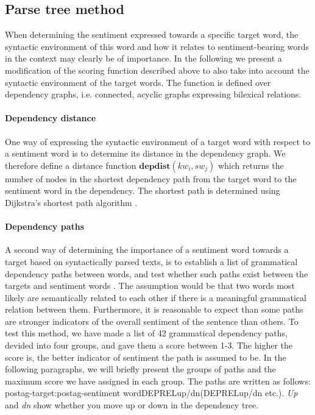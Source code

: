 \documentclass[11pt]{article}
\begin{document}
\subsection{Parse tree method}
\label{sec:dp}
When determining the sentiment expressed towards a specific target
word, the syntactic environment of this word and how it relates to
sentiment-bearing words in the context may clearly be of importance.
In the following we present a modification of the scoring function described above to also take into account the syntactic environment of the target words. The function is defined over dependency graphs, i.e. connected, acyclic graphs expressing bilexical relations.

\paragraph{Dependency distance} One way of expressing the syntactic environment of a target word with respect to a sentiment word is to determine its distance in the dependency graph. We therefore define a distance function $\mathbf{depdist}(kw_i, sw_{j})$ which returns the number of nodes in the shortest dependency path from the target word to the sentiment word in the dependency. The shortest path is determined using Dijkstra's shortest path algorithm \cite{Dij:59}.

\paragraph{Dependency paths}
A second way of determining the importance of a sentiment word towards a target based on syntactically parsed texts, is to establish a list of grammatical dependency paths between words, and test whether such paths exist between the targets and sentiment words \cite{Jiang11}. The assumption would be that two words most likely are semantically related to each other if there is a meaningful grammatical relation between them. Furthermore, it is reasonable to expect than some paths are stronger indicators of the overall sentiment of the sentence than others. To test this method, we have made a list of 42 grammatical dependency paths, devided into four groups, and gave them a score between 1-3. The higher the score is, the better indicator of sentiment the path is assumed to be. In the following paragraphs, we will briefly present the groups of paths and the maximum score we have assigned in each group. The paths are written as follows: postag-target:postag-sentiment word{\textunderscore}{\textunderscore}DEPREL{\textunderscore}up/dn({\textunderscore}{\textunderscore}DEPREL{\textunderscore}up/dn etc.). \emph{Up} and \emph{dn} show whether you move up or down in the dependency tree.
\end{document}
